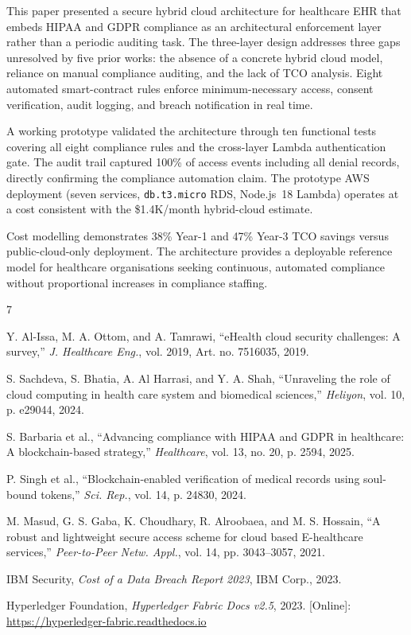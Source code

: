 \documentclass[10pt,twocolumn,a4paper]{article}
\begin{document}
This paper presented a secure hybrid cloud architecture for healthcare
EHR that embeds HIPAA and GDPR compliance as an architectural enforcement
layer rather than a periodic auditing task. The three-layer design
addresses three gaps unresolved by five prior works: the absence of a
concrete hybrid cloud model, reliance on manual compliance auditing, and
the lack of TCO analysis. Eight automated smart-contract rules enforce
minimum-necessary access, consent verification, audit logging, and
breach notification in real time.

A working prototype validated the architecture through ten functional
tests covering all eight compliance rules and the cross-layer Lambda
authentication gate. The audit trail captured 100\% of access events
including all denial records, directly confirming the compliance
automation claim. The prototype AWS deployment (seven services,
\texttt{db.t3.micro} RDS, Node.js~18 Lambda) operates at a cost
consistent with the \$1.4K/month hybrid-cloud estimate.

Cost modelling demonstrates 38\% Year-1 and 47\% Year-3 TCO savings
versus public-cloud-only deployment. The architecture provides a
deployable reference model for healthcare organisations seeking
continuous, automated compliance without proportional increases in
compliance staffing.

\begin{thebibliography}{7}

Y. Al-Issa, M. A. Ottom, and A. Tamrawi,
``eHealth cloud security challenges: A survey,''
\textit{J. Healthcare Eng.}, vol. 2019, Art. no. 7516035, 2019.

S. Sachdeva, S. Bhatia, A. Al Harrasi, and Y. A. Shah,
``Unraveling the role of cloud computing in health care system and
biomedical sciences,''
\textit{Heliyon}, vol. 10, p. e29044, 2024.

S. Barbaria et al.,
``Advancing compliance with HIPAA and GDPR in healthcare: A
blockchain-based strategy,''
\textit{Healthcare}, vol. 13, no. 20, p. 2594, 2025.

P. Singh et al.,
``Blockchain-enabled verification of medical records using soul-bound
tokens,''
\textit{Sci. Rep.}, vol. 14, p. 24830, 2024.

M. Masud, G. S. Gaba, K. Choudhary, R. Alroobaea, and M. S. Hossain,
``A robust and lightweight secure access scheme for cloud based
E-healthcare services,''
\textit{Peer-to-Peer Netw. Appl.}, vol. 14, pp. 3043--3057, 2021.

IBM Security,
\textit{Cost of a Data Breach Report 2023},
IBM Corp., 2023.

Hyperledger Foundation,
\textit{Hyperledger Fabric Docs v2.5}, 2023.
[Online]: \url{https://hyperledger-fabric.readthedocs.io}

\end{thebibliography}
\end{document}
